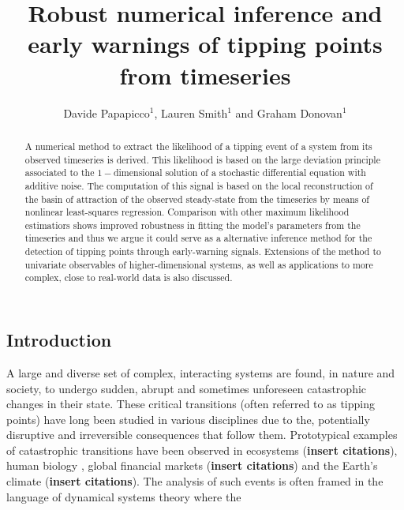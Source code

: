 \documentclass[openacc]{rsproca_new}
\begin{document}
\title{Robust numerical inference and early warnings of tipping points from timeseries}

\author{Davide Papapicco$^{1}$, Lauren Smith$^{1}$ and Graham Donovan$^{1}$}
\address{$^{1}$Department of Mathematics, University of Auckland, New Zealand}

\subject{applied mathematics, differential equations, statistical physics}

\begin{abstract}
        A numerical method to extract the likelihood of a tipping event of a system from its observed timeseries is derived.
        This likelihood is based on the large deviation principle associated to the $1-$dimensional solution of a stochastic differential equation with additive noise.
        The computation of this signal is based on the local reconstruction of the basin of attraction of the observed steady-state from the timeseries by means of nonlinear least-squares regression.
        Comparison with other maximum likelihood estimatiors shows improved robustness in fitting the model's parameters from the timeseries and thus we argue it could serve as a alternative inference method for the detection of tipping points through early-warning signals.
        Extensions of the method to univariate observables of higher-dimensional systems, as well as applications to more complex, close to real-world data is also discussed.
        \absbreak 
\end{abstract}


\begin{fmtext}
        \section{Introduction}
        A large and diverse set of complex, interacting systems are found, in nature and society, to undergo sudden, abrupt and sometimes unforeseen catastrophic changes in their state.
        These critical transitions (often referred to as tipping points) have long been studied in various disciplines due to the, potentially disruptive and irreversible consequences that follow them.
        Prototypical examples of catastrophic transitions have been observed in ecosystems (\textbf{insert citations}), human biology \cite{Kuehn2012, Donovan2015, Donovan2017}, global financial markets (\textbf{insert citations}) and the Earth's climate (\textbf{insert citations}).
        The analysis of such events is often framed in the language of dynamical systems theory where the
\end{fmtext}
\end{document}
